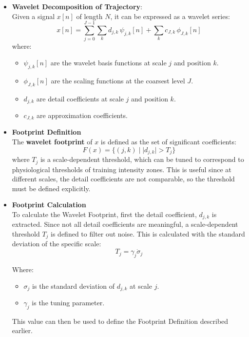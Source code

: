 \documentclass[12pt,a4paper]{article}
\begin{document}
\begin{itemize}
	\item \textbf{Wavelet Decomposition of Trajectory}: \\ Given a signal $x[n]$ of length $N$, it can be expressed as a wavelet series:
	      \[
		      x[n] =
		      \sum_{j=0}^{J-1} \sum_{k} d_{j,k} \, \psi_{j,k}[n]
		      + \sum_{k} c_{J,k} \, \phi_{J,k}[n]
	      \]
	      where:
	      \begin{itemize}
		      \item $\psi_{j,k}[n]$ are the wavelet basis functions at scale $j$ and position $k$.
		      \item $\phi_{J,k}[n]$ are the scaling functions at the coarsest level $J$.
		      \item $d_{j,k}$ are detail coefficients at scale $j$ and position $k$.
		      \item $c_{J,k}$ are approximation coefficients.
	      \end{itemize}
	\item \textbf{Footprint Definition}\\
	      The \textbf{wavelet footprint} of $x$ is defined as the set of significant coefficients:
	      \[
		      F(x) = \{ (j,k) \;|\; |d_{j,k}| > T_j \}
	      \]
	      where $T_j$ is a scale-dependent threshold, which can be tuned to correspond to physiological thresholds of training intensity zones. This is useful since
	      at different scales, the detail coefficients are not comparable, so the threshold must be defined explicitly.

	\item \textbf{Footprint Calculation}\\
	      To calculate the Wavelet Footprint, first the detail coefficient, $d_{j,k}$ is extracted. Since not all detail coefficients are meaningful, a scale-dependent threshold $T_j$
	      is defined to filter out noise. This is calculated with the standard deviation of the specific scale:
	      \[
		      T_j = \gamma_j \dot \sigma_j
	      \]

	      Where:
	      \begin{itemize}
		      \item $\sigma_j$ is the standard deviation of $d_{j,k}$ at scale $j$.
		      \item $\gamma_j$ is the tuning parameter.
	      \end{itemize}
	      This value can then be used to define the Footprint Definition described earlier.


\end{itemize}
\end{document}
